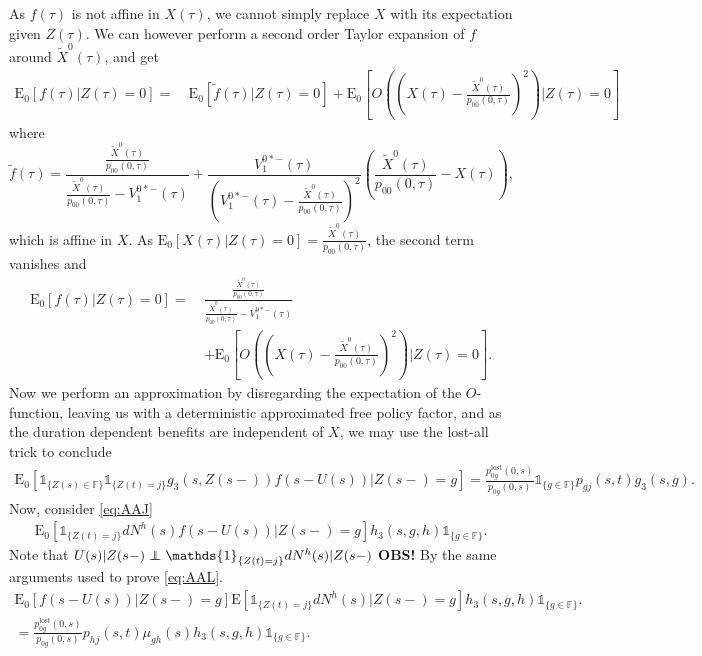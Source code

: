 \documentclass[12pt]{article}
\newcommand{\E}{\text{E}}
\newcommand{\indic}[1]{\mathds{1}_{ \{ #1 \} }}
\newcommand\independent{\protect\mathpalette{\protect\independenT}{\perp}}
\def\independenT#1#2{\mathrel{\rlap{$#1#2$}\mkern2mu{#1#2}}}
\theoremstyle{my_thm}
\theoremstyle{my_rem}
\begin{document}
As $f(\tau)$ is not affine in $X(\tau)$, we cannot simply replace $X$ with its expectation given $Z(\tau)$. We can however perform a second order Taylor expansion of $f$ around $\tilde{X}^0(\tau)$, and get
\begin{align*}
\E_0[f(\tau) |Z(\tau)=0]
= \ &
\E_0[\tilde{f}(\tau) |Z(\tau)=0]+ 
\E_0 \left[ O \left( \left( X(\tau)-\frac{\tilde{X}^0(\tau)}{p_{00}(0,\tau)} \right) ^2 \right) \bigg| Z(\tau)=0 \right]
\end{align*}
where 
$$
\tilde{f}(\tau)=
\frac{
	\frac{\tilde{X}^0(\tau)}{p_{00}(0,\tau)}
}{
	\frac{\tilde{X}^0(\tau)}{p_{00}(0,\tau)}
	-V_1^{0*-}(\tau)
}
+
\frac{
	V_1^{0*-}(\tau)
	}{
	\left( V_1^{0*-}(\tau)-
	\frac{\tilde{X}^0(\tau)}{p_{00}(0,\tau)}
	\right)^2
}
\left( \frac{\tilde{X}^0(\tau)}{p_{00}(0,\tau)}-X(\tau)\right),
$$
which is affine in $X$. As $\E_0[X(\tau)|Z(\tau)=0]=\frac{\tilde{X}^0(\tau)}{p_{00}(0,\tau)}$, the second term vanishes and
\begin{align*}
\E_0[f(\tau) |Z(\tau)=0]
= \ &
\frac{
	\frac{\tilde{X}^0(\tau)}{p_{00}(0,\tau)}
}{
	\frac{\tilde{X}^0(\tau)}{p_{00}(0,\tau)}
	-V_1^{0*-}(\tau)
}
\\
&+
\E_0 \left[ O \left( \left( X(\tau)-\frac{\tilde{X}^0(\tau)}{p_{00}(0,\tau)} \right) ^2 \right) \bigg| Z(\tau)=0 \right].
\end{align*}
Now we perform an approximation by disregarding the expectation of the $O$-function, leaving us with a deterministic approximated free policy factor, and as the duration dependent benefits are independent of $X$, we may use the lost-all trick to conclude
\begin{align*}
\E_0 [ \indic{Z(s) \in \mathbb{F}} \indic{Z(t)=j} g_3(s,Z(s-)) f(s-U(s))|Z(s-)=g]
=
\frac{p^{\text{lost}}_{0g}(0,s)}{p_{0g}(0,s)} \indic{g \in \mathbb{F}} p_{gj}(s,t)g_3(s,g).
\end{align*}
Now, consider \eqref{eq:AAJ}
\begin{align*}
\E_0 [  \indic{Z(t)=j}  dN^h(s) f(s-U(s))|Z(s-)=g] h_3(s,g,h) \indic{g \in \mathbb{F}}.
\end{align*}
Note that $U(s)|Z(s-) \independent \indic{Z(t)=j}dN^h(s)|Z(s-)$ \textbf{OBS!} By the same arguments used to prove \eqref{eq:AAL}.
\begin{align*}
\E_0[f(s-U(s))|Z(s-)=g] \E[ \indic{Z(t)=j}dN^h(s) |Z(s-)=g] h_3(s,g,h) \indic{g \in \mathbb{F}}.
\\
=\frac{p_{0g}^\text{lost}(0,s)}{p_{0g}(0,s)} p_{hj}(s,t) \mu_{gh}(s) h_3(s,g,h) \indic{g \in \mathbb{F}}.
\end{align*}
\end{document}
